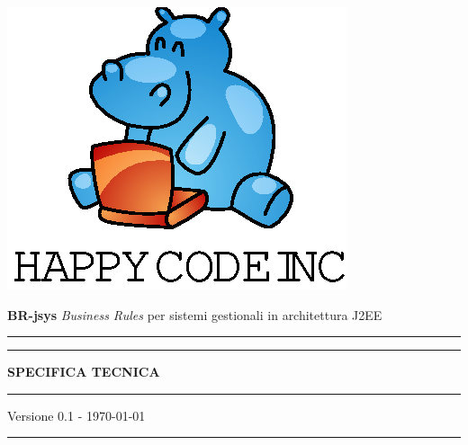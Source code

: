 \documentclass[11pt,titlepage,a4paper]{report}
\begin{document}

\begin{titlepage}
\begin{center}
\vspace*{0.5in}
\includegraphics{logo.eps}
\vspace*{0.2in}

{\Large \textbf{BR-jsys}}
{\Large \emph{Business Rules} per sistemi gestionali in architettura J2EE } 
\vspace{1.3in}
\par\rule{10cm}{.4pt} \par
\par\rule{12cm}{1pt} \par
\vspace*{0.5in}
\LARGE \textbf {SPECIFICA TECNICA}
\vspace*{0.5in}
\par\rule{12cm}{1pt} \par
{\large Versione 0.1 - \today}
\par\rule{10cm}{.4pt} \par
\end{center}
\end{titlepage}
\vspace*{0.5in}

\end{document}
